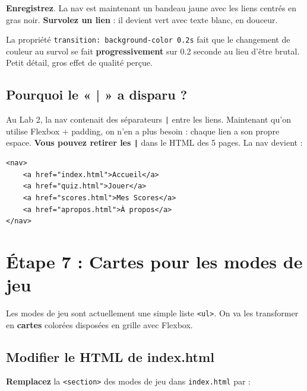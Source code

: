 \documentclass[11pt,a4paper]{article}
\newcommand{\cmark}{\ding{51}}
\begin{document}
\textbf{Enregistrez}. La nav est maintenant un bandeau jaune avec les
liens centrés en gras noir. \textbf{Survolez un lien} : il devient vert
avec texte blanc, en douceur. \cmark

\begin{retenirbox}
La propriété \texttt{transition: background-color 0.2s} fait que le
changement de couleur au survol se fait \textbf{progressivement} sur
0.2 seconde au lieu d'être brutal. Petit détail, gros effet de
qualité perçue.
\end{retenirbox}

\subsection{Pourquoi le « | » a disparu ?}

Au Lab 2, la nav contenait des séparateurs \texttt{|} entre les liens.
Maintenant qu'on utilise Flexbox + padding, on n'en a plus besoin :
chaque lien a son propre espace. \textbf{Vous pouvez retirer les
\texttt{|}} dans le HTML des 5 pages. La nav devient :

\begin{lstlisting}[language=HTML5]
<nav>
    <a href="index.html">Accueil</a>
    <a href="quiz.html">Jouer</a>
    <a href="scores.html">Mes Scores</a>
    <a href="apropos.html">À propos</a>
</nav>
\end{lstlisting}

\newpage

\section{Étape 7 : Cartes pour les modes de jeu}

Les modes de jeu sont actuellement une simple liste \texttt{<ul>}. On va
les transformer en \textbf{cartes} colorées disposées en grille avec
Flexbox.

\subsection{Modifier le HTML de index.html}

\textbf{Remplacez} la \texttt{<section>} des modes de jeu dans
\texttt{index.html} par :
\end{document}
